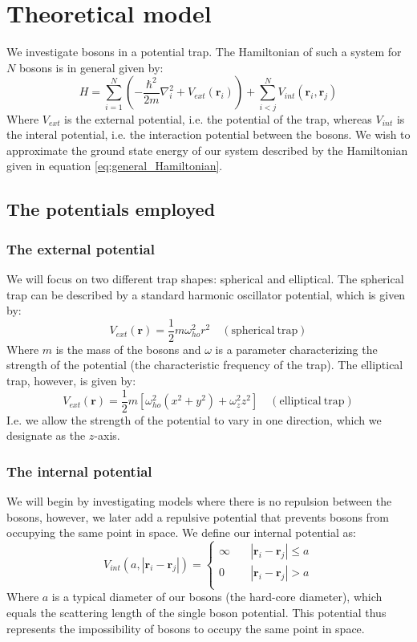 \documentclass[a4paper, 10pt]{article}
\begin{document}
	\section{Theoretical model}
	We investigate bosons in a potential trap. The Hamiltonian of such a system for $N$ bosons is in general given by:
	\begin{equation} \label{eq:general_Hamiltonian}
	H=\sum_{i=1}^N\left(-\frac{\hbar^2}{2m}\nabla_i^2 +V_{ext}(\boldsymbol{r}_i)\right)+\sum_{i<j}^N V_{int}(\boldsymbol{r}_i, \boldsymbol{r}_j)
	\end{equation}
	Where $V_{ext}$ is the external potential, i.e. the potential of the trap, whereas $V_{int}$ is the interal potential, i.e. the interaction potential between the bosons. We wish to approximate the ground state energy of our system described by the Hamiltonian given in equation \ref{eq:general_Hamiltonian}.
	\subsection{The potentials employed}
	\subsubsection{The external potential}
	We will focus on two different trap shapes: spherical and elliptical. The spherical trap can be described by a standard harmonic oscillator potential, which is given by:
	\begin{equation}
	V_{ext}(\boldsymbol{r})=\frac{1}{2}m\omega_{ho}^2 r^2 \quad \mathrm{(spherical\  trap)}
	\end{equation}
	Where $m$ is the mass of the bosons and $\omega$ is a parameter characterizing the strength of the potential (the characteristic frequency of the trap). The elliptical trap, however, is given by:
	\begin{equation}
	V_{ext}(\boldsymbol{r})=\frac{1}{2}m[\omega_{ho}^2 (x^2+y^2)+\omega_z^2 z^2] \quad \mathrm{(elliptical\  trap)}
	\end{equation}
	I.e. we allow the strength of the potential to vary in one direction, which we designate as the $z$-axis.
	\subsubsection{The internal potential}
	We will begin by investigating models where there is no repulsion between the bosons, however, we later add a repulsive potential that prevents bosons from occupying the same point in space. We define our internal potential as:
	\begin{equation}
	V_{int}(a,|\boldsymbol{r}_i-\boldsymbol{r}_j|)= 
	\begin{cases}
	\infty & \quad |\boldsymbol{r}_i-\boldsymbol{r}_j| \leq  a\\
	0 & \quad |\boldsymbol{r}_i-\boldsymbol{r}_j|>  a\\
	\end{cases}
	\end{equation}
	Where $a$ is a typical diameter of our bosons (the hard-core diameter), which equals the scattering length of the single boson potential.
	This potential thus represents the impossibility of bosons to occupy the same point in space.
\end{document}
